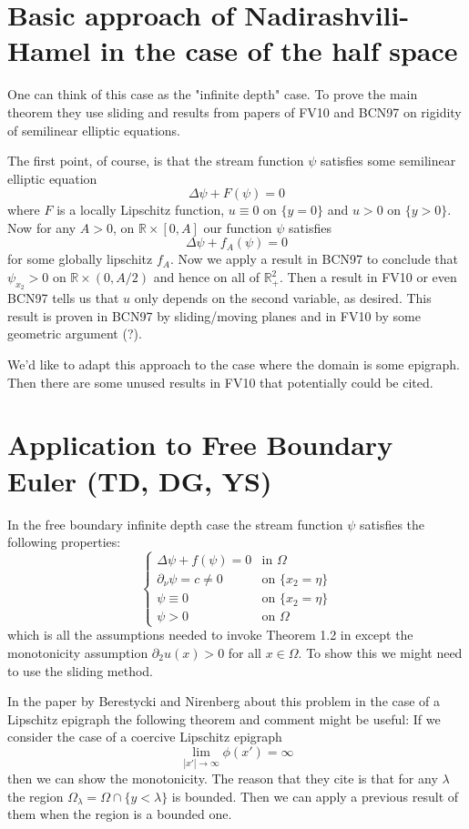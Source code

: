 \section{Basic approach of Nadirashvili-Hamel in the case of the half space}

One can think of this case as the "infinite depth" case. To prove the main theorem they use sliding and results from papers of FV10 and BCN97 on rigidity of semilinear elliptic equations.

The first point, of course, is that the stream function $\psi$ satisfies some semilinear elliptic equation
\[\Delta \psi + F(\psi) = 0\]
where $F$ is a locally Lipschitz function, $u \equiv 0$ on $\{y = 0\}$ and $u > 0$ on $\{y > 0\}$. Now for any $A > 0$, on $\mathbb{R} \times [0, A]$ our function $\psi$ satisfies
\[\Delta \psi + f_A(\psi) = 0\]
for some globally lipschitz $f_A$. Now we apply a result in BCN97 to conclude that $\psi_{x_2} > 0$ on $\mathbb{R} \times (0, A/2)$ and hence on all of $\mathbb{R}^2_+$. Then a result in FV10 or even BCN97 tells us that $u$ only depends on the second variable, as desired. This result is proven in BCN97 by sliding/moving planes and in FV10 by some geometric argument (?).

We'd like to adapt this approach to the case where the domain is some epigraph. Then there are some unused results in FV10 that potentially could be cited.

\section{Application to Free Boundary Euler (TD, DG, YS)}

In the free boundary infinite depth case the stream function $\psi$ satisfies the following properties:
\[\begin{cases} \Delta \psi + f(\psi) = 0 & \text{in $\Omega$} \\ 
\partial_\nu\psi = c \neq 0 & \text{on $\{x_2 = \eta\}$} \\ 
\psi \equiv 0 & \text{on $\{x_2 = \eta\}$} \\
\psi > 0 & \text{on $\Omega$}
\end{cases}\]
which is all the assumptions needed to invoke Theorem 1.2 in \cite{FV10} except the monotonicity assumption $\partial_2u(x) > 0$ for all $x \in \Omega$. To show this we might need to use the sliding method.

In the paper by Berestycki and Nirenberg about this problem in the case of a Lipschitz epigraph the following theorem and comment might be useful: If we consider the case of a coercive Lipschitz epigraph
\[\lim_{|x'| \to \infty}\phi(x') = \infty\]
then we can show the monotonicity. The reason that they cite is that for any $\lambda$ the region $\Omega_\lambda = \Omega \cap \{y < \lambda\}$ is bounded. Then we can apply a previous result of them when the region is a bounded one.

